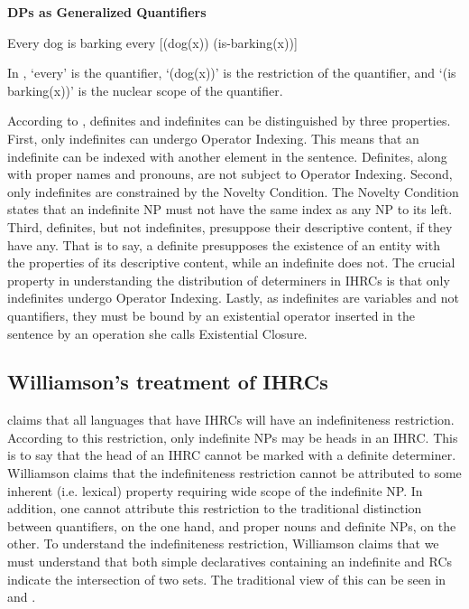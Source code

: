 \documentclass[output=paper]{LSP/langsci}
\begin{document}
\ea \textbf{DPs as Generalized Quantifiers}
\begin{xlist}
\ex Every dog is barking \label{boyle39a}
\ex every [(dog(x)) (is-barking(x))] \label{boyle39b}
\end{xlist}
\z

In , `every' is the quantifier, `(dog(x))' is the restriction of the quantifier, and `(is barking(x))' is the nuclear scope of the quantifier.  

According to \citet{Heim1982}, definites and indefinites can be distinguished by three properties. First, only indefinites can undergo Operator Indexing. This means that an indefinite can be indexed with another element in the sentence. Definites, along with proper names and pronouns, are not subject to Operator Indexing. Second, only indefinites are constrained by the Novelty Condition. The Novelty Condition states that an indefinite NP must not have the same index as any NP to its left. Third, definites, but not indefinites, presuppose their descriptive content, if they have any.  That is to say, a definite presupposes the existence of an entity with the properties of its descriptive content, while an indefinite does not. The crucial property in understanding the distribution of determiners in IHRCs is that only indefinites undergo Operator Indexing. Lastly, as indefinites are variables and not quantifiers, they must be bound by an existential operator inserted in the sentence by an operation she calls Existential Closure.

\subsection{Williamson's treatment of IHRCs} 

\citet{Williamson1987} claims that all languages that have IHRCs will have an indefiniteness restriction. According to this restriction, only indefinite NPs may be heads in an IHRC. This is to say that the head of an IHRC cannot be marked with a definite determiner. Williamson claims that the indefiniteness restriction cannot be attributed to some inherent (i.e. lexical) property requiring wide scope of the indefinite NP. In addition, one cannot attribute this restriction to the traditional distinction between quantifiers, on the one hand, and proper nouns and definite NPs, on the other. To understand the indefiniteness restriction, Williamson claims that we must understand that both simple declaratives containing an indefinite and RCs indicate the intersection of two sets. The traditional view of this can be seen in  and .
\end{document}
